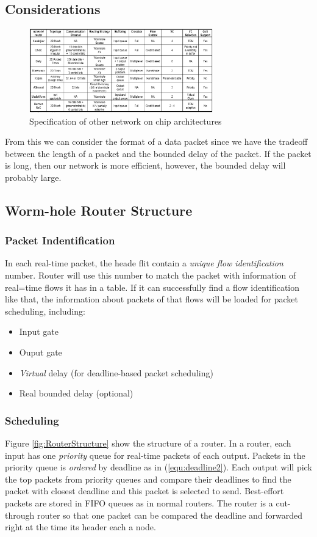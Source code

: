 \documentclass[conference, twocolumn]{IEEEtran}
\theoremstyle{definition}
\begin{document}
\subsection{Considerations}

\begin{figure}[htp]
\centering
\includegraphics[width=8cm]{pics/OtherArcs.png}
\caption[Other Spec.]
{Specification of other network on chip architectures}\label{fig:otherSpec}
\end{figure}

From this we can consider the format of a data packet since we have the 
tradeoff between the length of a packet and the bounded delay of the packet. 
If the packet is long, then our network is more efficient, however, the bounded 
delay will probably large.

\subsection{Worm-hole Router Structure}
\subsubsection{Packet Indentification}
In each real-time packet, the heade flit contain a {\em unique flow
identification} number. Router will use this number to match the packet with
information of real=time flows it has in a table. If it can successfully find a
flow identification like that, the information about packets of that flows will
be loaded  for packet scheduling, including:
\begin{itemize}
  \item Input gate
  \item Ouput gate
  \item {\em Virtual} delay (for deadline-based packet scheduling)
  \item Real bounded delay (optional)
\end{itemize}

\subsubsection{Scheduling}
Figure \ref{fig:RouterStructure} show the structure of a router. In a router,
each input has one {\em priority} queue for real-time packets of each output.
Packets in the priority queue is {\em ordered} by deadline as in
(\ref{equ:deadline2}). Each output will pick the top packets from priority
queues and compare their deadlines to find the packet with closest deadline and this
packet is selected to send. Best-effort packets are stored in FIFO queues as in
normal routers. The router is a cut-through router so that one packet can be
compared the deadline and forwarded right at the time its header each a node.
\end{document}

